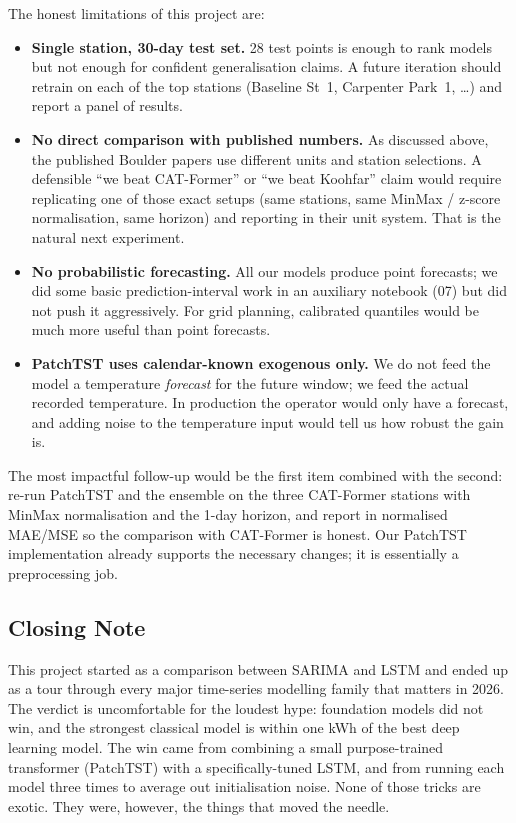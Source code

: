 The honest limitations of this project are:
\begin{itemize}[leftmargin=*]
    \item \textbf{Single station, 30-day test set.} 28 test points is
    enough to rank models but not enough for confident generalisation
    claims. A future iteration should retrain on each of the top
    stations (Baseline St~1, Carpenter Park~1, \dots) and report a
    panel of results.
    \item \textbf{No direct comparison with published numbers.} As
    discussed above, the published Boulder papers use different units
    and station selections. A defensible ``we beat CAT-Former'' or
    ``we beat Koohfar'' claim would require replicating one of those
    exact setups (same stations, same MinMax / z-score normalisation,
    same horizon) and reporting in their unit system. That is the
    natural next experiment.
    \item \textbf{No probabilistic forecasting.} All our models
    produce point forecasts; we did some basic prediction-interval
    work in an auxiliary notebook (07) but did not push it
    aggressively. For grid planning, calibrated quantiles would be
    much more useful than point forecasts.
    \item \textbf{PatchTST uses calendar-known exogenous only.} We do
    not feed the model a temperature \emph{forecast} for the future
    window; we feed the actual recorded temperature. In production
    the operator would only have a forecast, and adding noise to the
    temperature input would tell us how robust the gain is.
\end{itemize}

The most impactful follow-up would be the first item combined with
the second: re-run PatchTST and the ensemble on the three CAT-Former
stations with MinMax normalisation and the 1-day horizon, and report
in normalised MAE/MSE so the comparison with CAT-Former is honest.
Our PatchTST implementation already supports the necessary changes;
it is essentially a preprocessing job.

\subsection{Closing Note}

This project started as a comparison between SARIMA and LSTM and ended
up as a tour through every major time-series modelling family that
matters in 2026. The verdict is uncomfortable for the loudest hype:
foundation models did not win, and the strongest classical model is
within one kWh of the best deep learning model. The win came from
combining a small purpose-trained transformer (PatchTST) with a
specifically-tuned LSTM, and from running each model three times to
average out initialisation noise. None of those tricks are exotic.
They were, however, the things that moved the needle.
